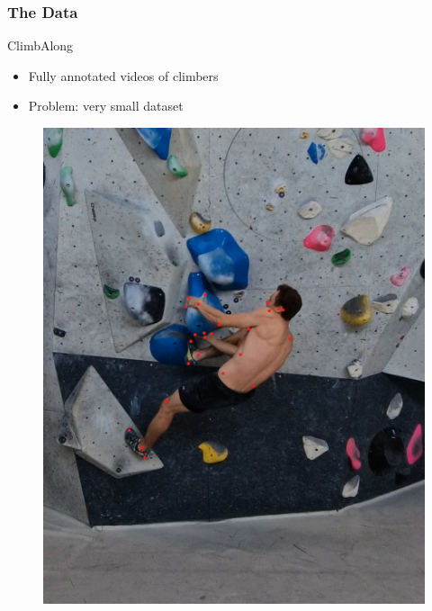 \documentclass{beamer}
\begin{document}
\begin{frame}
    \frametitle{The Data}
    \begin{minipage}{0.5\textwidth}
        ClimbAlong
        \begin{itemize}
            \item Fully annotated videos of climbers
            \item<2-> Problem: very small dataset
        \end{itemize}
    \end{minipage} \hfill
    \begin{minipage}{0.45\textwidth}
        \begin{figure}
            \center
            \includegraphics[width = \textwidth]{./entities/ClimbAlong_cv_2.PNG}
        \end{figure}
    \end{minipage}
\end{frame}
\end{document}
